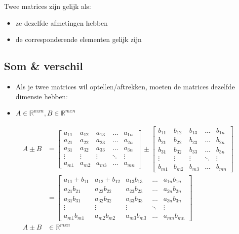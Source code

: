 \documentclass{article}
\begin{document}
Twee matrices zijn gelijk als:

\begin{itemize}
    \item ze dezelfde afmetingen hebben
    \item de corresponderende elementen gelijk zijn
\end{itemize}


\subsection{Som \& verschil}

\begin{itemize}
    \item Als je twee matrices wil optellen/aftrekken, moeten de matrices dezelfde dimensie hebben:
    \item $A \in \mathbb{R}^{mxn}, B \in \mathbb{R}^{mxn}$
\end{itemize}

\begin{align*}
    A \pm B & = 
\begin{bmatrix}
    a_{11} & a_{12} & a_{13} & \dots & a_{1n}\\
    a_{21} & a_{22} & a_{23} & \dots & a_{2n}\\
    a_{31} & a_{32} & a_{33} & \dots & a_{3n}\\
    \vdots & \vdots & \vdots & \ddots & \vdots\\
    a_{m1} & a_{m2} & a_{m3} & \dots & a_{mn}
\end{bmatrix} \pm 
\begin{bmatrix}
    b_{11} & b_{12} & b_{13} & \dots & b_{1n}\\
    b_{21} & b_{22} & b_{23} & \dots & b_{2n}\\
    b_{31} & b_{32} & b_{33} & \dots & b_{3n}\\
    \vdots & \vdots & \vdots & \ddots & \vdots\\
    b_{m1} & b_{m2} & b_{m3} & \dots & b_{mn}
\end{bmatrix} \\
& = \begin{bmatrix}
    a_{11}+b_{11} & a_{12}+b_{12} & a_{13}b_{13} & \dots & a_{1n}b_{1n}\\
    a_{21}b_{21} & a_{22}b_{22} & a_{23}b_{23} & \dots & a_{2n}b_{2n}\\
    a_{31}b_{31} & a_{32}b_{32} & a_{33}b_{33} & \dots & a_{3n}b_{3n}\\
    \vdots & \vdots & \vdots & \ddots & \vdots\\
    a_{m1}b_{m1} & a_{m2}b_{m2} & a_{m3}b_{m3} & \dots & a_{mn}b_{mn}
\end{bmatrix}\\
A \pm B & \in \mathbb{R}^{mxn}
\end{align*}
\end{document}
